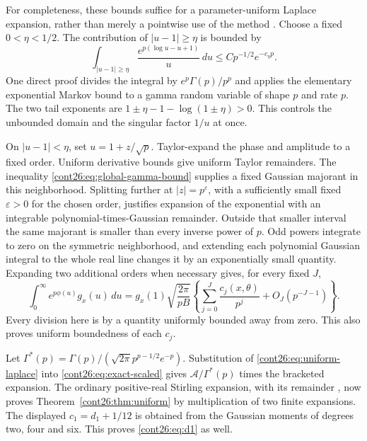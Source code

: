 \documentclass[11pt,letterpaper]{article}
\numberwithin{equation}{section}
\theoremstyle{plain}
\theoremstyle{definition}
\theoremstyle{remark}
\begin{document}
For completeness, these bounds suffice for a parameter-uniform Laplace
expansion, rather than merely a pointwise use of the method
\cite{DLMF23,TemmeUniform}. Choose a fixed $0<\eta<1/2$.
The contribution of $|u-1|\geq\eta$ is bounded by
\[
 \int_{|u-1|\geq\eta}\frac{e^{p(\log u-u+1)}}u\,du
 \leq C p^{-1/2}e^{-c_\eta p}.
\]
One direct proof divides the integral by
$e^p\Gamma(p)/p^p$ and applies the elementary exponential Markov
bound to a gamma random variable of shape $p$ and rate $p$.
The two tail exponents are
$1\pm\eta-1-\log(1\pm\eta)>0$.
This controls the unbounded domain and the singular factor $1/u$ at once.

On $|u-1|<\eta$, set $u=1+z/\sqrt p$. Taylor-expand the phase and
amplitude to a fixed order. Uniform derivative bounds give uniform
Taylor remainders. The inequality \eqref{cont26:eq:global-gamma-bound} supplies
a fixed Gaussian majorant in this neighborhood. Splitting further at
$|z|=p^\varepsilon$, with a sufficiently small fixed $\varepsilon>0$
for the chosen order, justifies expansion of the exponential with an
integrable polynomial-times-Gaussian remainder. Outside that smaller
interval the same majorant is smaller than every inverse power of $p$.
Odd powers integrate to zero on the symmetric neighborhood, and extending
each polynomial Gaussian integral to the whole real line changes it by
an exponentially small quantity. Expanding two additional orders when
necessary gives, for every fixed $J$,
\begin{equation}\label{cont26:eq:uniform-laplace}
 \int_0^\infty e^{p\phi(u)}g_x(u)\,du
 =g_x(1)\sqrt{\frac{2\pi}{pB}}
   \left\{\sum_{j=0}^J\frac{c_j(x,\theta)}{p^j}
                  +O_J(p^{-J-1})\right\}.
\end{equation}
Every division here is by a quantity uniformly bounded away from zero.
This also proves uniform boundedness of each $c_j$.

Let
$\Gamma^*(p)=\Gamma(p)/(\sqrt{2\pi}p^{p-1/2}e^{-p})$.
Substitution of \eqref{cont26:eq:uniform-laplace} into
\eqref{cont26:eq:exact-scaled} gives $\mathcal A/\Gamma^*(p)$ times the
bracketed expansion. The ordinary positive-real Stirling expansion,
with its remainder \cite{DLMF511}, now proves
Theorem~\ref{cont26:thm:uniform} by multiplication of two finite expansions.
The displayed $c_1=d_1+1/12$ is obtained from the Gaussian moments of
degrees two, four and six. This proves \eqref{cont26:eq:d1} as well.
\end{document}

